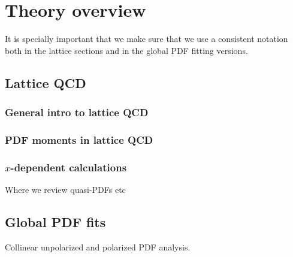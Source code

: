 
\section{Theory overview}
\label{sec:theoryoverview}

It is specially important that we make sure that we use a consistent
notation both in the lattice sections and in the global
PDF fitting versions.

\subsection{Lattice QCD}


\subsubsection{General intro to lattice QCD}


\subsubsection{PDF moments in lattice QCD}


\subsubsection{$x$-dependent calculations}

Where we review quasi-PDFs etc



\subsection{Global PDF fits}

Collinear unpolarized and polarized PDF analysis.
